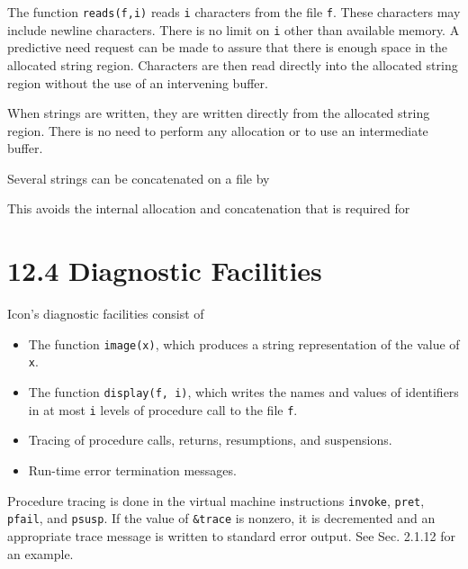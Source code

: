 The function \texttt{reads(f,i)} reads \texttt{i} characters from the
file \texttt{f}. These characters may include newline
characters. There is no limit on \texttt{i} other than available
memory. A predictive need request can be made to assure that there is
enough space in the allocated string region. Characters are then read
directly into the allocated string region without the use of an
intervening buffer.

When strings are written, they are written directly from the allocated
string region. There is no need to perform any allocation or to use an
intermediate buffer.

Several strings can be concatenated on a file by


This avoids the internal allocation and concatenation that is required for


\section[12.4 Diagnostic Facilities]{12.4 Diagnostic Facilities}

Icon's diagnostic facilities consist of

\liststyleLxvii
\begin{itemize}

\item The function \texttt{image(x)}, which produces a string
representation of the value of \texttt{x}.

\item The function \texttt{display(f, i)}, which writes the names and
values of identifiers in at most \texttt{i} levels of procedure call
to the file \texttt{f}.

\item Tracing of procedure calls, returns, resumptions, and suspensions.

\item Run-time error termination messages.

\end{itemize}

Procedure tracing is done in the virtual machine instructions \texttt{invoke},
\texttt{pret}, \texttt{pfail}, and \texttt{psusp}. If the value of \texttt{\&trace} is nonzero,
it is decremented and an appropriate trace message is written to
standard error output.  See Sec. 2.1.12 for an example.

